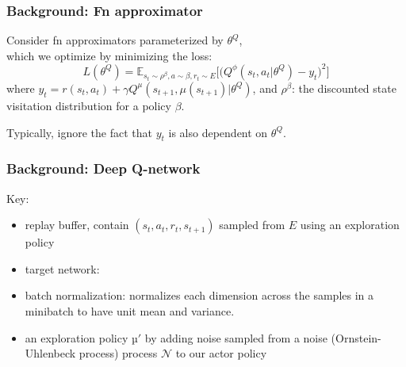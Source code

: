 \begin{frame}
\frametitle{Background: Fn approximator}
Consider fn approximators parameterized by $\theta^Q$, \\
which we optimize by minimizing the loss:
\begin{equation*}
L(\theta^Q) =\mathbb{E}_{s_t \sim \rho^{\beta}, a \sim \beta, r_t \sim E} \Big[ \Big( Q^{\phi} (s_t,a_t|\theta^Q) - y_t \Big)^2 \Big]
\end{equation*}
where
$y_t = r(s_t,a_t) + \gamma Q^{\mu}(s_{t+1},\mu(s_{t+1}) | \theta^Q)$, and
$\rho^{\beta}$: the discounted state visitation distribution for a policy $\beta$.

Typically, ignore the fact that $y_t$ is also dependent on $\theta^Q$.\\

\end{frame}


\begin{frame}
\frametitle{Background: Deep Q-network \cite{Mnih2013}}

Key:
\begin{itemize}
  \item replay buffer,
  contain $(s_t, a_t, r_t, s_{t+1})$ sampled from $E$ using an exploration policy
  \item target network:
  \item batch normalization: normalizes each dimension across the samples
  in a minibatch to have unit mean and variance.
  \item an exploration policy $µ'$ by adding noise sampled from
  a noise (Ornstein-Uhlenbeck process) process $\mathcal{N}$ to our actor policy
\end{itemize}



\end{frame}

